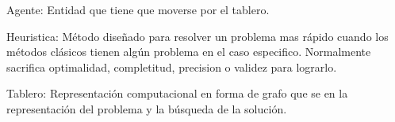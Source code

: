 
{\setlength{\parskip}{0cm} %
Agente: Entidad que tiene que moverse por el tablero.

Heuristica: Método diseñado para resolver un problema mas rápido cuando los métodos clásicos tienen algún problema en el caso especifico. Normalmente sacrifica optimalidad, completitud, precision o validez para lograrlo.

Tablero: Representación computacional en forma de grafo que se en la representación del problema y la búsqueda de la solución.
}
